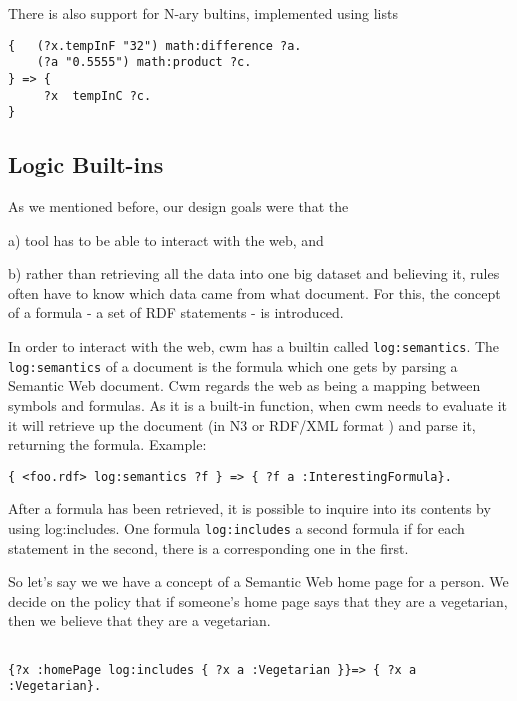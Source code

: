\documentclass{tlp}
\begin{document}
\par There is also support for N-ary bultins, implemented using
lists
\begin{verbatim}
{   (?x.tempInF "32") math:difference ?a.
    (?a "0.5555") math:product ?c.
} => {
     ?x  tempInC ?c.
}
\end{verbatim}
\subsection{\empty Logic Built-ins}
  

\par As we mentioned before, our design goals were that the

\par a) tool has to be able to interact with the web, and

\par b) rather than retrieving all the data into one big dataset and
believing it, rules often have to know which data came from what
document. For this, the concept of a formula - a set of RDF
statements - is introduced.

\par In order to interact with the web, cwm has a builtin called
{\tt log:semantics}. The {\tt log:semantics} of a
document is the formula which one gets by parsing a Semantic Web
document. Cwm regards the web as being a mapping between symbols
and formulas. As it is a built-in function, when cwm needs to
evaluate it it will retrieve up the document (in N3 or RDF/XML
format ) and parse it, returning the formula. Example:
\begin{verbatim}
{ <foo.rdf> log:semantics ?f } => { ?f a :InterestingFormula}.
\end{verbatim}

\par After a formula has been retrieved, it is possible to inquire
into its contents by using log:includes. One formula
{\tt log:includes} a second formula if for each statement in
the second, there is a corresponding one in the first.

\par So let's say we we have a concept of a Semantic Web home page
for a person. We decide on the policy that if someone's home page
says that they are a vegetarian, then we believe that they are a
vegetarian.
\begin{verbatim}

{?x :homePage log:includes { ?x a :Vegetarian }}=> { ?x a :Vegetarian}.
\end{verbatim}
\end{document}

